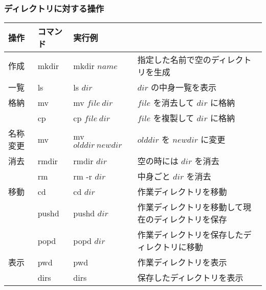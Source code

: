 \begin{frame}
\frametitle{ディレクトリに対する操作}
\scriptsize
  \begin{tabular}{l|l|lp{4cm}}
操作 & コマンド & 実行例 & \\\hline
作成 & mkdir & mkdir $name$ & 指定した名前で空のディレクトリを生成\\
一覧 & ls & ls $dir$ & $dir$ の中身一覧を表示\\
格納 & mv & mv $file\ dir$ & $file$ を消去して $dir$ に格納\\
     & cp & cp $file\ dir$ & $file$ を複製して $dir$ に格納\\
名称変更 & mv & mv $olddir\ newdir$ & $olddir$ を $newdir$ に変更\\
消去 & rmdir & rmdir $dir$ & 空の時には $dir$ を消去\\
     & rm    & rm -r $dir$ & 中身ごと $dir$ を消去\\
移動 & cd & cd $dir$ & 作業ディレクトリを移動\\
     & pushd & pushd $dir$ & 作業ディレクトリを移動して現在のディレクトリを保存\\
     & popd & popd $dir$ & 作業ディレクトリを保存したディレクトリに移動\\
表示 & pwd & pwd & 作業ディレクトリを表示\\
     & dirs & dirs & 保存したディレクトリを表示\\
  \end{tabular}
\end{frame}
